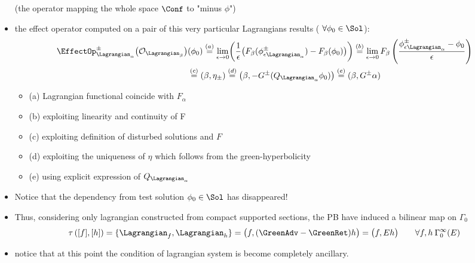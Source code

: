 \documentclass[a4paper,11pt]{scrartcl}
\begin{document}
\begin{itemize}
        (the operator mapping the whole space $\Conf$ to  "minus $\phi$")
        \item the effect operator computed on a pair of this very particular Lagrangians results ( $\forall     \phi_0\in \Sol$):
        \begin{align}
            \EffectOp_{\Lagrangian_\alpha}^\pm \big( \mathcal{O}_{\Lagrangian_\beta} \big)& (\phi_0) 
            \stackrel{(a)}{=}
             \lim_{\epsilon \rightarrow 0} \biggr( \frac{1}{\epsilon}\big(F_\beta ( \phi_{\epsilon \Lagrangian_\alpha}^\pm) - F_\beta(\phi_0) \big) \biggr) 
            \stackrel{(b)}{=}
            \lim_{\epsilon \rightarrow 0} F_\beta\left( \frac{ \phi_{\epsilon \Lagrangian_\alpha}^\pm- \phi_0}{\epsilon} \right)  
                        \nonumber\\
            &\stackrel{(c)}{=} (\beta, \eta_\pm) 
                \stackrel{(d)}{=} \big( \beta, - G^\pm (Q_{\Lagrangian_\alpha} \phi_0 ) \big) 
                \stackrel{(e)}{=} ( \beta, G^\pm \alpha) \nonumber
        \end{align}
        \begin{footnotesize}\begin{itemize}
            \item    (a) Lagrangian functional coincide with $F_\alpha$
            \item (b) exploiting linearity and continuity of F
            \item (c) exploiting definition of disturbed solutions and $F$
            \item (d) exploiting the uniqueness of $\eta$ which follows from the green-hyperbolicity
            \item (e) using explicit expression of $Q_{\Lagrangian_\alpha}$
        \end{itemize}\end{footnotesize}
        \item Notice that the dependency from test solution $\phi_0 \in \Sol$ has disappeared!
        \item Thus, considering only lagrangian constructed from compact supported sections, the PB have induced a bilinear map on $\Gamma_0$
        $$                             \tau\left( [f] , [h]\right) = \{\Lagrangian_f , \Lagrangian_h\} = \big( f , (\GreenAdv - \GreenRet)h \big) = \big(f, E h\big) \qquad \forall f,h \: \Gamma_0^\infty (E)$$
        \item notice that at this point the condition of lagrangian system is become completely ancillary.\\

\end{itemize}
\end{document}
